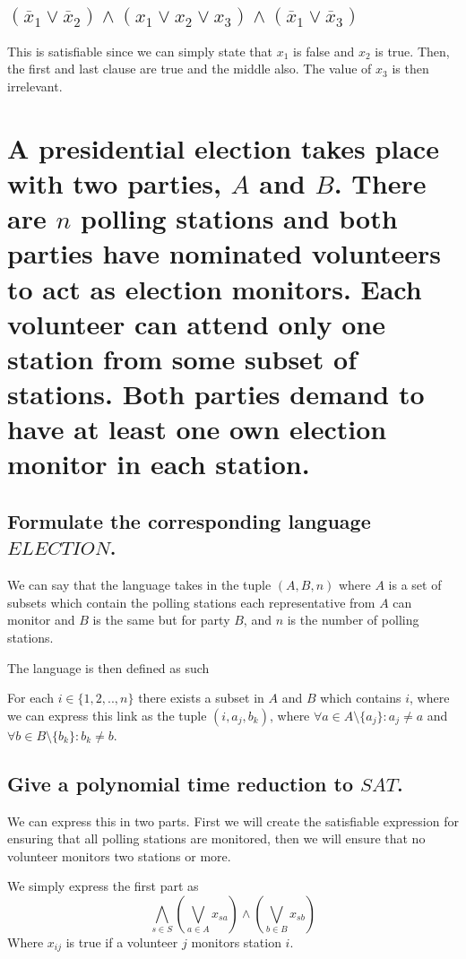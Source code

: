 \documentclass{article}
\begin{document}
	\subsection{$(\overline{x}_1\lor\overline{x}_2)\land
	(x_1\lor x_2\lor x_3)\land(\overline{x}_1\lor\overline{x}_3)$}
	This is satisfiable since we can simply state that $x_1$ is false and 
	$x_2$ is true. Then, the first and last clause are true and the middle
	also. The value of $x_3$ is then irrelevant.

	\newpage
	\section{A presidential election takes place with two parties, $A$ and 
	$B$. There are $n$ polling stations and both parties have nominated 
	volunteers to act as election monitors. Each volunteer can attend only 
one station from some subset of stations. Both parties demand to have at 
least one own election monitor in each station.}

    \subsection{Formulate the corresponding language $ELECTION$.}
	We can say that the language takes in the tuple 
	$(A, B, n)$ where $A$ is a set of subsets which contain the polling 
	stations each representative from $A$ can monitor and $B$ is the same 
	but for party $B$, and $n$ is the number of polling stations.

	The language is then defined as such

	For each $i\in\{1,2,..,n\}$ there exists a subset in $A$ and $B$
	which contains $i$, where we can express this link as the tuple 
	$(i, a_j, b_k)$, where $\forall a\in A\setminus\{a_j\}: a_j \neq a$ and\\
	$\forall b\in B\setminus\{b_k\}: b_k \neq b$.
	
	\subsection{Give a polynomial time reduction to $SAT$.}
	We can express this in two parts. First we will create the satisfiable 
	expression for ensuring that all polling stations are monitored, then 
	we will ensure that no volunteer monitors two stations or more.

	We simply express the first part as 
	\begin{equation}
		\bigwedge\limits_{s\in S} (\bigvee\limits_{a\in A} x_{sa}) \wedge 
			(\bigvee\limits_{b\in B} x_{sb})
		\label{eq:gamer}
	\end{equation}
	Where $x_{ij}$ is true if a volunteer $j$ monitors station $i$.
\end{document}

